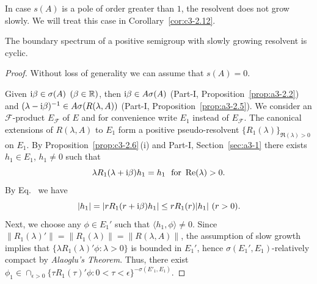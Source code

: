 In case $s(A)$ is a pole of order greater than $1$, the resolvent does not grow slowly.
We will treat this case in Corollary~\ref{cor:c3-2.12}.
\begin{theorem}\label{thm:c3-2.10}
	The boundary spectrum of a positive semigroup with slowly growing resolvent is cyclic.
\end{theorem}
\begin{proof}
Without loss of generality we can assume that $s(A) = 0$.

Given $\mathrm{i}\beta \in \sigma(A)$ $(\beta \in \mathbb{R} )$, then $\mathrm{i}\beta \in A\sigma(A)$ (Part-I, Proposition~\ref{prop:a3-2.2}) and $(\lambda-\mathrm{i}\beta)^{-1} \in A\sigma(R(\lambda,A))$ (Part-I, Proposition~\ref{prop:a3-2.5}).
We consider an $\mathcal{F}$-product $E_{\mathcal{F}}$ of\/ $E$ and for convenience write $E_{1}$ instead of\/ $E_{\mathcal{F}}$.
The canonical extensions of\/ $R(\lambda,A)$ to $E_{1}$ form a positive pseudo-resolvent $\{R_{1}(\lambda)\}_{\Re(\lambda)>0}$ on $E_{1}$.
By Proposition~\ref{prop:c3-2.6}\,(i) and Part-I, Section~\ref{sec:a3-1} there exists $h_{1} \in E_{1}$, $h_{1} \neq 0$ such that
\begin{equation}\label{eq:c3-2.16}
	\lambda R_{1}(\lambda+\mathrm{i}\beta)h_{1} = h_{1} \ \text{ for }  \mathop{}\!\mathrm{Re}(\lambda) > 0 .
\end{equation}
By Eq.~ we have
\begin{equation}\label{eq:c3-2.17}%
	|h_{1}| = |r R_{1}(r+\im\beta)h_{1}| \leq r R_{1}(r)|h_{1}| \ (r > 0) .
\end{equation}
Next, we choose any $\phi \in E_{1}'$ such that $\langle  h_{1},\phi \rangle \neq 0$.
Since $\|R_{1}(\lambda)'\| = \|R_{1}(\lambda)\| = \|R(\lambda,A)\|$, the assumption of slow growth implies that $\{\lambda R_{1}(\lambda)'\phi \colon \lambda > 0\}$ is bounded in $E_{1}'$, hence $\sigma(E_{1}',E_{1})$-relatively compact by \emph{Alaoglu's Theorem}.
Thus, there exist $\phi_{1} \in \cap_{\epsilon>0}\{\tau R_{1}(\tau)'\phi \colon 0<\tau<\epsilon\}^{-\sigma(E'_1,E_1)}$.


\end{proof}
